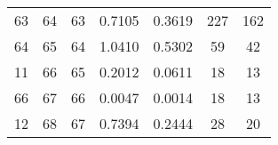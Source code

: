 \begin{table}
\begin{adjustbox}{width=0.95\textwidth,center=\textwidth}
\begin{tabular}{ccccccc}
63                                                        & 64                                                          & 63                                                  & 0.7105                                                                    & 0.3619                                                                    & 227                                                                         & 162                                                                              \\
64                                                        & 65                                                          & 64                                                  & 1.0410                                                                    & 0.5302                                                                    & 59                                                                          & 42                                                                               \\
11                                                        & 66                                                          & 65                                                  & 0.2012                                                                    & 0.0611                                                                    & 18                                                                          & 13                                                                               \\
66                                                        & 67                                                          & 66                                                  & 0.0047                                                                    & 0.0014                                                                    & 18                                                                          & 13                                                                               \\
12                                                        & 68                                                          & 67                                                  & 0.7394                                                                    & 0.2444                                                                    & 28                                                                          & 20                                                                               \\

\end{tabular}
\end{adjustbox}
\end{table}
